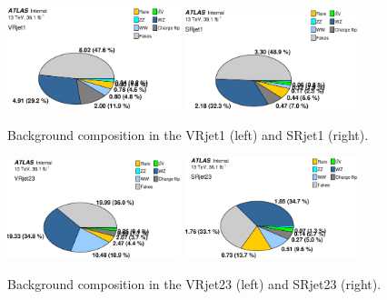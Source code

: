 \begin{figure}[htbp]
\centering
\includegraphics[width=0.45\textwidth]{data/plot/VR/BkgComposition_VRjet1.eps}
\includegraphics[width=0.45\textwidth]{data/plot/VR/BkgComposition_SRjet1.eps}
\caption{Background composition in the VRjet1 (left) and SRjet1 (right).}
\label{fig:background composition_1}
\end{figure}

\begin{figure}[htbp]
\centering
\includegraphics[width=0.45\textwidth]{data/plot/VR/BkgComposition_VRjet23.eps}
\includegraphics[width=0.45\textwidth]{data/plot/VR/BkgComposition_SRjet23.eps}
\caption{Background composition in the VRjet23 (left) and SRjet23 (right).}
\label{fig:background composition_2}
\end{figure}

